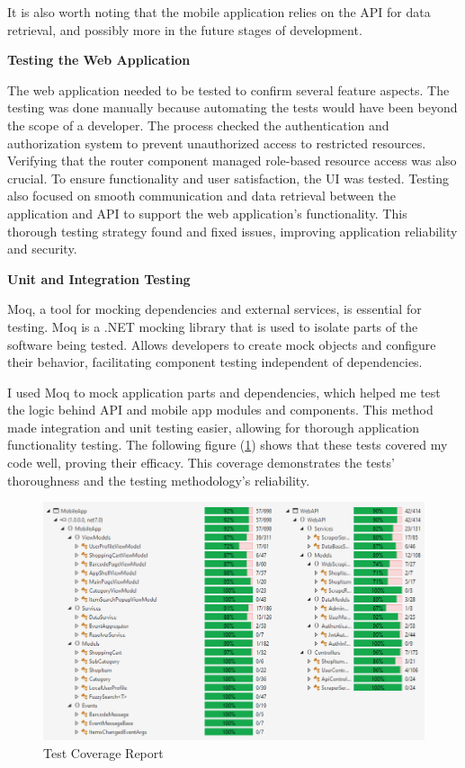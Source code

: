 It is also worth noting that the mobile application relies on the API for data retrieval, and possibly more in the future stages of development.

\noindent\textbf{Testing the Web Application}

The web application needed to be tested to confirm several feature aspects. The testing was done manually because automating the tests would have been beyond the scope of a developer. The process checked the authentication and authorization system to prevent unauthorized access to restricted resources. Verifying that the router component managed role-based resource access was also crucial. To ensure functionality and user satisfaction, the UI was tested. Testing also focused on smooth communication and data retrieval between the application and API to support the web application's functionality. This thorough testing strategy found and fixed issues, improving application reliability and security.

\noindent\textbf{Unit and Integration Testing}

Moq, a tool for mocking dependencies and external services, is essential for testing. Moq is a .NET mocking library that is used to isolate parts of the software being tested. Allows developers to create mock objects and configure their behavior, facilitating component testing independent of dependencies. \cite{moq}

I used Moq to mock application parts and dependencies, which helped me test the logic behind API and mobile app modules and components. This method made integration and unit testing easier, allowing for thorough application functionality testing. The following figure (\ref{fig:testcoverage}) shows that these tests covered my code well, proving their efficacy. This coverage demonstrates the tests' thoroughness and the testing methodology's reliability.

\begin{figure}[H]
	\centering
	\includegraphics[width=0.8\linewidth]{img/testcoverage.png}
	\caption{Test Coverage Report}
	\label{fig:testcoverage}
\end{figure}
